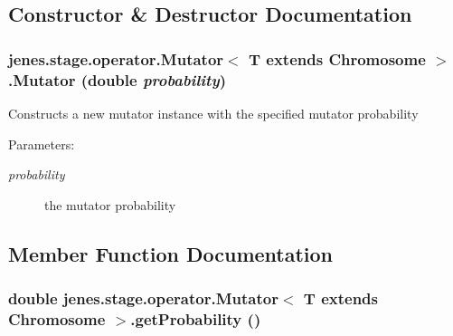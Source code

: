 \subsection{Constructor \& Destructor Documentation}
\hypertarget{classjenes_1_1stage_1_1operator_1_1_mutator_3_01_t_01extends_01_chromosome_01_4_01aea5c94d65f99cca8a24be7250a06a}{
\subsubsection[Mutator]{\setlength{\rightskip}{0pt plus 5cm}jenes.stage.operator.Mutator$<$ T extends Chromosome $>$.Mutator (double {\em probability})}}
\label{classjenes_1_1stage_1_1operator_1_1_mutator_3_01_t_01extends_01_chromosome_01_4_01aea5c94d65f99cca8a24be7250a06a}


Constructs a new mutator instance with the specified mutator probability

\begin{Desc}
\item[Parameters:]
\begin{description}
\item[{\em probability}]the mutator probability \end{description}
\end{Desc}


\subsection{Member Function Documentation}
\hypertarget{classjenes_1_1stage_1_1operator_1_1_mutator_3_01_t_01extends_01_chromosome_01_4_f8cd41f87d99e8bc5d00bf9a21ffcd86}{
\subsubsection[getProbability]{\setlength{\rightskip}{0pt plus 5cm}double jenes.stage.operator.Mutator$<$ T extends Chromosome $>$.getProbability ()}}
\label{classjenes_1_1stage_1_1operator_1_1_mutator_3_01_t_01extends_01_chromosome_01_4_f8cd41f87d99e8bc5d00bf9a21ffcd86}


